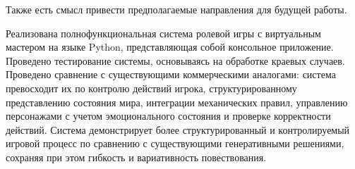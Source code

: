 Также есть смысл привести предполагаемые направления для будущей работы.

Реализована полнофункциональная система ролевой игры с виртуальным мастером на языке Python, представляющая собой консольное приложение. Проведено тестирование системы, основываясь на обработке краевых случаев. Проведено сравнение с существующими коммерческими аналогами: система превосходит их по контролю действий игрока, структурированному представлению состояния мира, интеграции механических правил, управлению персонажами с учетом эмоционального состояния и проверке корректности действий. Система демонстрирует более структурированный и контролируемый игровой процесс по сравнению с существующими генеративными решениями, сохраняя при этом гибкость и вариативность повествования.

